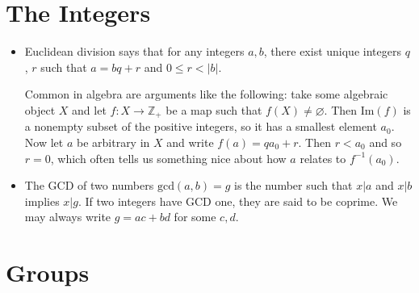 \documentclass{article}
\begin{document}
\section{The Integers}
\begin{itemize}
  \item{
    Euclidean division says that for any integers $a, b$, there exist unique
    integers $q$, $r$ such that $a = bq + r$ and $0 \leq r < |b|$.

    Common in algebra are arguments like the following: take some algebraic
    object $X$ and let $f: X \to \mathbb{Z}_+$ be a map such that
    $f(X) \neq \varnothing$. Then $\mathrm{Im}(f)$ is a nonempty
    subset of the positive integers, so it has a smallest element
    $a_0$. Now let $a$ be arbitrary in $X$ and write
    $f(a) = q a_0 + r$. Then $r < a_0$ and so $r = 0$, which often
    tells us something nice about how $a$ relates to $f^{-1}(a_0)$.
  }
  \item{
    The GCD of two numbers $\mathrm{gcd}(a, b) = g$ is the number such
    that $x \vert a$ and $x \vert b$ implies $x \vert g$. If two
    integers have GCD one, they are said to be coprime. We may always
    write $g = ac + bd$ for some $c, d$.
  }
\end{itemize}

\section{Groups}
\end{document}
